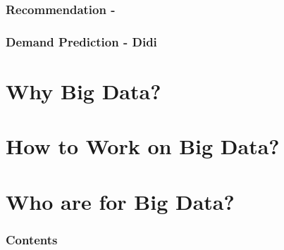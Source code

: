 \documentclass{beamer}
\begin{document}
\begin{frame}
\frametitle{Recommendation - }
\end{frame}

\begin{frame}
\frametitle{Demand Prediction - Didi}
\end{frame}

\section{Why Big Data?}

\section{How to Work on Big Data?}

\section{Who are for Big Data?}

\begin{frame}[plain]
\frametitle{Contents}
\tableofcontents[hideallsubsections]
\end{frame}
\end{document}
